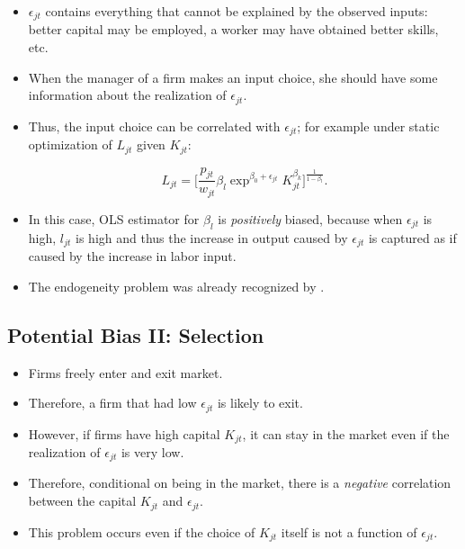\documentclass[]{book}
\providecommand{\tightlist}{%
  \setlength{\itemsep}{0pt}\setlength{\parskip}{0pt}}
\theoremstyle{definition}
\theoremstyle{definition}
\theoremstyle{definition}
\theoremstyle{remark}
\begin{document}
\begin{itemize}
\tightlist
\item
  \(\epsilon_{jt}\) contains everything that cannot be explained by the
  observed inputs: better capital may be employed, a worker may have
  obtained better skills, etc.
\item
  When the manager of a firm makes an input choice, she should have some
  information about the realization of \(\epsilon_{jt}\).
\item
  Thus, the input choice can be correlated with \(\epsilon_{jt}\); for
  example under static optimization of \(L_{jt}\) given \(K_{jt}\):

  \begin{equation}
  L_{jt} = \Bigg[\frac{p_{jt}}{w_{jt}} \beta_l \exp^{\beta_0 + \epsilon_{jt}} K_{jt}^{\beta_k}\Bigg]^{\frac{1}{1 - \beta_l}}.
  \end{equation}
\item
  In this case, OLS estimator for \(\beta_l\) is \textit{positively}
  biased, because when \(\epsilon_{jt}\) is high, \(l_{jt}\) is high and
  thus the increase in output caused by \(\epsilon_{jt}\) is captured as
  if caused by the increase in labor input.
\item
  The endogeneity problem was already recognized by
  \citet{Marschak1944}.
\end{itemize}

\subsection{Potential Bias II:
Selection}\label{potential-bias-ii-selection}

\begin{itemize}
\tightlist
\item
  Firms freely enter and exit market.
\item
  Therefore, a firm that had low \(\epsilon_{jt}\) is likely to exit.
\item
  However, if firms have high capital \(K_{jt}\), it can stay in the
  market even if the realization of \(\epsilon_{jt}\) is very low.
\item
  Therefore, conditional on being in the market, there is a
  \textit{negative} correlation between the capital \(K_{jt}\) and
  \(\epsilon_{jt}\).
\item
  This problem occurs even if the choice of \(K_{jt}\) itself is not a
  function of \(\epsilon_{jt}\).
\end{itemize}
\end{document}
